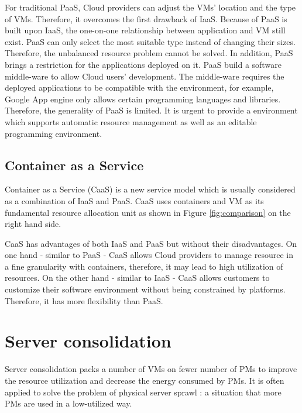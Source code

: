 For traditional PaaS, Cloud providers can adjust the VMs' location and the type of VMs. Therefore, it overcomes the first drawback of IaaS. Because of PaaS is built upon IaaS, the one-on-one relationship between application and VM still exist. PaaS can only select the most suitable type instead of changing their sizes. Therefore, the unbalanced resource problem cannot be solved. In addition, PaaS brings a restriction for the applications deployed on it. PaaS build a software middle-ware to allow Cloud users' development. The middle-ware requires the deployed applications to be compatible with the environment, for example, Google App engine only allows certain programming languages and libraries. Therefore, the generality of PaaS is limited. It is urgent to provide a environment which supports automatic resource management as well as an editable programming environment.


\subsection{Container as a Service}
Container as a Service (CaaS) \cite{Piraghaj:2017vi} is a new service model which is usually considered as a combination of IaaS and PaaS. CaaS uses containers and VM as its fundamental resource allocation unit as shown in Figure \ref{fig:comparison} on the right hand side. 


CaaS has advantages of both IaaS and PaaS  but without their disadvantages. On one hand - similar to PaaS - CaaS allows Cloud providers to manage resource in a fine granularity with containers, therefore, it may lead to high utilization of resources. On the other hand - similar to IaaS - CaaS allows customers to customize their software environment without being constrained by platforms. Therefore, it has more flexibility than PaaS.
	

\section{Server consolidation}

Server consolidation packs a number of VMs on fewer number of PMs to improve the resource utilization and decrease the energy consumed by PMs. It is often applied to solve the problem of physical server sprawl \cite{Khanna:2006vq}: a situation that more PMs are used in a low-utilized way. 



